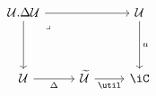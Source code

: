 \[\begin{tikzcd}
	{\Ty.\Delta\Ty} && \Ty \\
	\\
	\Ty & \Tm & \iC
	\arrow["\Delta"', from=3-1, to=3-2]
	\arrow["\util"', from=3-2, to=3-3]
	\arrow["u", from=1-3, to=3-3]
	\arrow[from=1-1, to=3-1]
	\arrow[from=1-1, to=1-3]
	\arrow["\lrcorner"{anchor=center, pos=0.125}, draw=none, from=1-1, to=3-3]
\end{tikzcd}\]